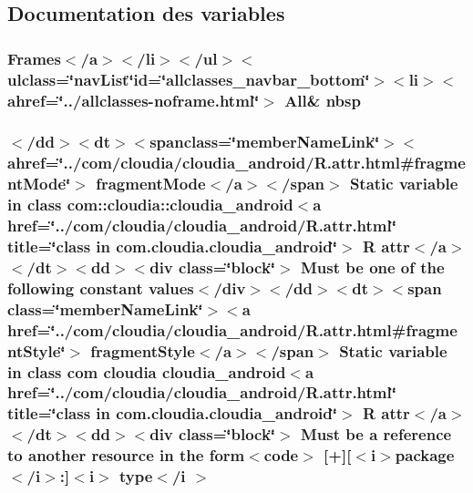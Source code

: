 \subsection{Documentation des variables}
\hypertarget{index-6_8html_a479d00f21dbca369efe3be97f1ef785a}{
\subsubsection[{nbsp}]{\setlength{\rightskip}{0pt plus 5cm}Frames$<$/{\bf a}$>$$<$/li$>$$<$/ul$>$$<$ulclass=\char`\"{}nav\-List\char`\"{}id=\char`\"{}allclasses\-\_\-navbar\-\_\-bottom\char`\"{}$>$$<$li$>$$<$ahref=\char`\"{}../allclasses-\/noframe.\-html\char`\"{}$>$ All\& nbsp}}\label{index-6_8html_a479d00f21dbca369efe3be97f1ef785a}
\hypertarget{index-6_8html_a35f9137e716fc3b84b48c777cb9d8bea}{
\subsubsection[{type$<$/i $>$}]{\setlength{\rightskip}{0pt plus 5cm}$<$/{\bf dd}$>$$<${\bf dt}$>$$<$spanclass=\char`\"{}member\-Name\-Link\char`\"{}$>$$<$ahref=\char`\"{}../com/cloudia/cloudia\-\_\-android/R.\-attr.\-html\#fragment\-Mode\char`\"{}$>$ fragment\-Mode$<$/{\bf a}$>$$<$/{\bf span}$>$ Static variable in {\bf class} com\-::cloudia\-::cloudia\-\_\-android$<${\bf a} href=\char`\"{}../com/cloudia/cloudia\-\_\-android/R.\-attr.\-html\char`\"{} title=\char`\"{}class in com.\-cloudia.\-cloudia\-\_\-android\char`\"{}$>$ R attr$<$/{\bf a}$>$$<$/{\bf dt}$>$$<${\bf dd}$>$$<$div {\bf class}=\char`\"{}block\char`\"{}$>$ Must be one of the following constant values$<$/div$>$$<$/{\bf dd}$>$$<${\bf dt}$>$$<${\bf span} {\bf class}=\char`\"{}member\-Name\-Link\char`\"{}$>$$<$a href=\char`\"{}../com/cloudia/cloudia\-\_\-android/R.\-attr.\-html\#fragment\-Style\char`\"{}$>$ fragment\-Style$<$/{\bf a}$>$$<$/{\bf span}$>$ Static variable in {\bf class} com cloudia cloudia\-\_\-android$<${\bf a} href=\char`\"{}../com/cloudia/cloudia\-\_\-android/R.\-attr.\-html\char`\"{} title=\char`\"{}class in com.\-cloudia.\-cloudia\-\_\-android\char`\"{}$>$ R attr$<$/{\bf a}$>$$<$/{\bf dt}$>$$<${\bf dd}$>$$<$div {\bf class}=\char`\"{}block\char`\"{}$>$ Must be {\bf a} reference to another resource in the form$<$code$>$ \mbox{[}+\mbox{]}\mbox{[}$<${\bf i}$>$package$<$/{\bf i}$>$\-:\mbox{]}$<${\bf i}$>$ type$<$/{\bf i} $>$}}\label{index-6_8html_a35f9137e716fc3b84b48c777cb9d8bea}
